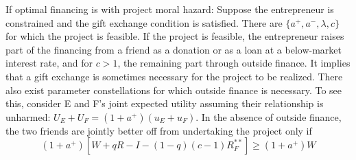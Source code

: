 \documentclass{article}
\begin{document}
    If optimal financing is with project moral hazard: Suppose the entrepreneur is constrained and the gift exchange condition is satisfied. 
    There are $\{a^+, a^-, \lambda, c\}$ for which the project is feasible. If the project is feasible, the entrepreneur raises part of the financing from a friend as a donation or as a 
    loan at a below-market interest rate, and for $c > 1$, the remaining part through outside finance.
    It implies that a gift exchange is sometimes necessary for the project to be realized. There also exist parameter 
    constellations for which outside finance is necessary. To see this, consider E and F’s joint expected utility assuming their relationship is unharmed: $U_E + U_F = (1 + a^+) (u_E + u_F )$. In the absence of outside finance, the two friends are jointly better off 
    from undertaking the project only if
    \begin{equation}
        (1 + a^+) [W + qR - I - (1 - q)(c - 1)R_F^{**}]\ge (1 + a^+) W
    \end{equation}
\end{document}
